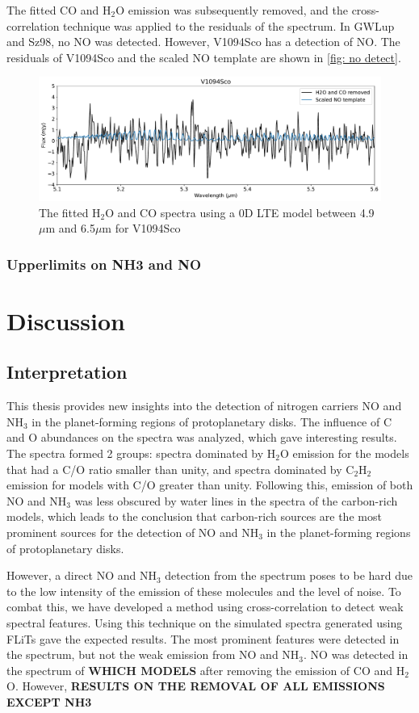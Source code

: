 \documentclass[twoside, single, authoryear, semicolon, 12pt]{lion-msc}
\newcommand{\4}{$_4$}
\newcommand{\3}{$_3$}
\newcommand{\2}{$_2$}
\begin{document}
The fitted CO and H\2O emission was subsequently removed, and the cross-correlation technique was applied to the residuals of the spectrum. In GWLup and Sz98, no NO was detected. However, V1094Sco has a detection of NO. The residuals of V1094Sco and the scaled NO template are shown in \autoref{fig: no detect}. 
\begin{figure}[!ht]
    \centering
    \includegraphics[width=\linewidth]{Figures/NO_Detect.pdf}
    \caption{The fitted H\2O and CO spectra using a 0D LTE model between 4.9 $\mu$m and 6.5$\mu$m for V1094Sco}
    \label{fig: no detect}
\end{figure}


\subsection{Upperlimits on NH3 and NO}

\chapter{Discussion}\label{Ch: Discussion}
\section{Interpretation}
This thesis provides new insights into the detection of nitrogen carriers NO and NH\3 in the planet-forming regions of protoplanetary disks. The influence of C and O abundances on the spectra was analyzed, which gave interesting results. The spectra formed 2 groups: spectra dominated by H\2O emission for the models that had a C/O ratio smaller than unity, and spectra dominated by C\2H\2 emission for models with C/O greater than unity. Following this, emission of both NO and NH\3 was less obscured by water lines in the spectra of the carbon-rich models, which leads to the conclusion that carbon-rich sources are the most prominent sources for the detection of NO and NH\3 in the planet-forming regions of protoplanetary disks. 

However, a direct NO and NH\3 detection from the spectrum poses to be hard due to the low intensity of the emission of these molecules and the level of noise. To combat this, we have developed a method using cross-correlation to detect weak spectral features. Using this technique on the simulated spectra generated using FLiTs gave the expected results. The most prominent features were detected in the spectrum, but not the weak emission from NO and NH\3. NO was detected in the spectrum of \textbf{WHICH MODELS} after removing the emission of CO and H\2O. However, \textbf{RESULTS ON THE REMOVAL OF ALL EMISSIONS EXCEPT NH3}
\end{document}
